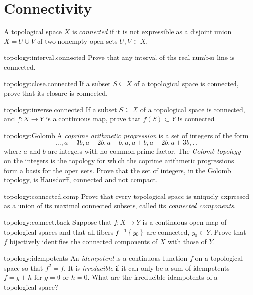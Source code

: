 \section{Connectivity}
A topological space \(X\) is \emph{connected} if it is not expressible as a disjoint union \(X= U \cup V\) of two nonempty open sets \(U,V \subset X\).
\begin{problem*}{topology:interval.connected}
Prove that any interval of the real number line is connected.
\end{problem*}
\begin{problem*}{topology:close.connected}
If a subset \(S\subseteq X\) of a topological space is connected, prove that its closure is connected.
\end{problem*}
\begin{problem*}{topology:inverse.connected}
If a subset \(S\subseteq X\) of a topological space is connected, and \(f\colon X \to Y\) is a continuous map, prove that \(f(S)\subset Y\) is connected.
\end{problem*}
\begin{problem*}{topology:Golomb}
A \emph{coprime arithmetic progression} is a set of integers of the form
\[
\dots,a-3b,a-2b,a-b,a,a+b,a+2b,a+3b,\dots
\]
where \(a\) and \(b\) are integers with no common prime factor.
The \emph{Golomb topology} on the integers is the topology for which the coprime arithmetic progressions form a basis for the open sets.
Prove that the set of integers, in the Golomb topology, is Hausdorff, connected and not compact.
\end{problem*}
\begin{problem}{topology:connected.comp}
Prove that every topological space is uniquely expressed as a union of its maximal connected subsets, called its \emph{connected components}.
\end{problem}
\begin{problem}{topology:connect.back}
Suppose that \(f\colon X \to Y\) is a continuous open map of topological spaces and that all fibers \(f^{-1}\set{y_0}\) are connected, \(y_0\in Y\). 
Prove that \(f\) bijectively identifies the connected components of \(X\) with those of \(Y\).
\end{problem}
\begin{problem}{topology:idempotents}
An \emph{idempotent} is a continuous function \(f\) on a topological space so that \(f^2=f\).
It is \emph{irreducible} if it can only be a sum of idempotents \(f=g+h\) for \(g=0\) or \(h=0\).
What are the irreducible idempotents of a topological space?
\end{problem}


